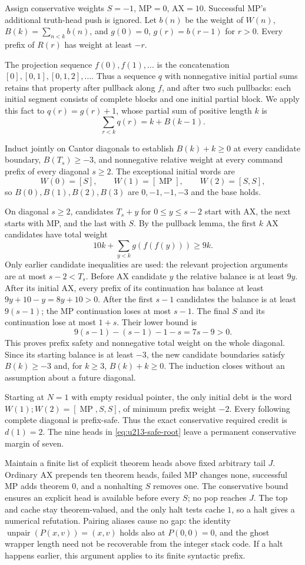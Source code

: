 Assign conservative weights $S=-1$, MP$=0$, AX$=10$.  Successful MP's
additional truth-head push is ignored.  Let $b(n)$ be the weight of
$W(n)$, $B(k)=\sum_{n<k}b(n)$, and $g(0)=0$, $g(r)=b(r-1)$ for $r>0$.
Every prefix of $R(r)$ has weight at least $-r$.

The projection sequence $f(0),f(1),\ldots$ is the concatenation
$[0],[0,1],[0,1,2],\ldots$.  Thus a sequence $q$ with nonnegative
initial partial sums retains that property after pullback along $f$,
and after two such pullbacks: each initial segment consists of complete
blocks and one initial partial block.  We apply this fact to
$q(r)=g(r)+1$, whose partial sum of positive length $k$ is
\[
 \sum_{r<k}q(r)=k+B(k-1).
\]

Induct jointly on Cantor diagonals to establish
$B(k)+k\geq0$ at every candidate boundary, $B(T_s)\geq-3$, and
nonnegative relative weight at every command prefix of every diagonal
$s\geq2$.  The exceptional initial words are
\[
 W(0)=[S],\qquad W(1)=[\operatorname{MP}],\qquad W(2)=[S,S],
\]
so $B(0),B(1),B(2),B(3)$ are $0,-1,-1,-3$ and the base holds.

On diagonal $s\geq2$, candidates $T_s+y$ for $0\leq y\leq s-2$
start with AX, the next starts with MP, and the last with $S$.
By the pullback lemma, the first $k$ AX candidates have total weight
\[
 10k+\sum_{y<k}g(f(f(y)))\geq9k.
\]
Only earlier candidate inequalities are used: the relevant projection
arguments are at most $s-2<T_s$.  Before AX candidate $y$ the relative
balance is at least $9y$.  After its initial AX, every prefix of its
continuation has balance at least $9y+10-y=8y+10>0$.
After the first $s-1$ candidates the balance is at least $9(s-1)$;
the MP continuation loses at most $s-1$.  The final $S$ and its
continuation lose at most $1+s$.  Their lower bound is
\[
 9(s-1)-(s-1)-1-s=7s-9>0.
\]
This proves prefix safety and nonnegative total weight on the whole
diagonal.  Since its starting balance is at least $-3$, the new
candidate boundaries satisfy $B(k)\geq-3$ and, for $k\geq3$,
$B(k)+k\geq0$.  The induction closes without an assumption about a
future diagonal.

Starting at $N=1$ with empty residual pointer, the only initial debt is
the word $W(1);W(2)=[\operatorname{MP},S,S]$, of minimum prefix
weight $-2$.  Every following complete diagonal is prefix-safe.
Thus the exact conservative required credit is $d(1)=2$.
The nine heads in \eqref{eq:u213-safe-root} leave a permanent
conservative margin of seven.

Maintain a finite list of explicit theorem heads above fixed arbitrary
tail $J$.  Ordinary AX prepends ten theorem heads, failed MP changes
none, successful MP adds theorem $0$, and a nonhalting $S$ removes one.
The conservative bound ensures an explicit head is available before
every $S$; no pop reaches $J$.  The top and cache stay theorem-valued,
and the only halt tests cache $1$, so a halt gives a numerical
refutation.  Pairing aliases cause no gap: the identity
$\operatorname{unpair}(P(x,v))=(x,v)$ holds also at $P(0,0)=0$,
and the ghost wrapper length need not be recoverable from the integer
stack code.  If a halt happens earlier, this argument applies to its
finite syntactic prefix.

